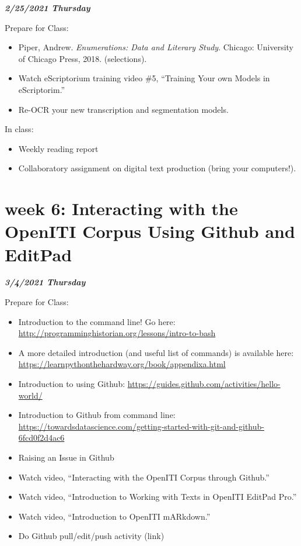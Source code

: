 \documentclass[
]{book}
\providecommand{\tightlist}{%
  \setlength{\itemsep}{0pt}\setlength{\parskip}{0pt}}
\begin{document}
\textbf{\emph{2/25/2021 Thursday}}

Prepare for Class:

\begin{itemize}
\tightlist
\item
  Piper, Andrew. \emph{Enumerations: Data and Literary Study}. Chicago: University of Chicago Press, 2018. (selections).
\item
  Watch eScriptorium training video \#5, ``Training Your own Models in eScriptorim.''
\item
  Re-OCR your new transcription and segmentation models.
\end{itemize}

In class:

\begin{itemize}
\tightlist
\item
  Weekly reading report
\item
  Collaboratory assignment on digital text production (bring your computers!).
\end{itemize}

\hypertarget{week-6-interacting-with-the-openiti-corpus-using-github-and-editpad-1}{%
\chapter{week 6: Interacting with the OpenITI Corpus Using Github and EditPad}\label{week-6-interacting-with-the-openiti-corpus-using-github-and-editpad-1}}

\textbf{\emph{3/4/2021 Thursday}}

Prepare for Class:

\begin{itemize}
\tightlist
\item
  Introduction to the command line! Go here: \url{http://programminghistorian.org/lessons/intro-to-bash}
\item
  A more detailed introduction (and useful list of commands) is available here: \url{https://learnpythonthehardway.org/book/appendixa.html}
\item
  Introduction to using Github: \url{https://guides.github.com/activities/hello-world/}
\item
  Introduction to Github from command line: \url{https://towardsdatascience.com/getting-started-with-git-and-github-6fcd0f2d4ac6}
\item
  Raising an Issue in Github
\item
  Watch video, ``Interacting with the OpenITI Corpus through Github.''
\item
  Watch video, ``Introduction to Working with Texts in OpenITI EditPad Pro.''
\item
  Watch video, ``Introduction to OpenITI mARkdown.''
\item
  Do Github pull/edit/push activity (link)
\end{itemize}
\end{document}
